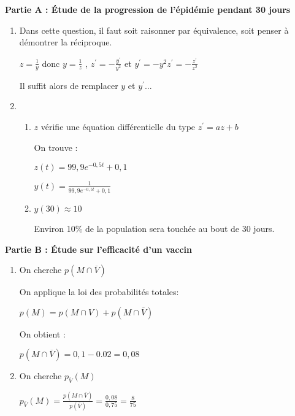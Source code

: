           \begin{corrige}
               \textbf{Partie A : Étude de la progression de l'épidémie pendant 30 jours}
               \begin{enumerate}
                    \item
                    Dans cette question, il faut soit raisonner par équivalence, soit penser à démontrer la réciproque.
                    \par
                    $z=\frac{1}{y}$ donc $y=\frac{1}{z}$ , $z^{\prime}=-\frac{y^{\prime}}{y^{2}}$ et $y^{\prime}=-y^{2}z^{\prime}=-\frac{z^{\prime}}{z^{2}}$
                    \par
                    Il suffit alors de remplacer $y$ et $y^{\prime}$...
                    \item
                    \begin{enumerate}[label=\alph*.]
                         \item
                         $z$ vérifie une équation différentielle du type $z^{\prime}=az+b$
                         \par
                         On trouve :
                         \par
                         $z\left(t\right)=99,9e^{-0,5t}+0,1$
                         \par
                         $y\left(t\right)=\frac{1}{99,9e^{-0,5t}+0,1}$
                         \item
                         $y\left(30\right)\approx 10$
                         \par
                         Environ 10\% de la population sera touchée au bout de 30 jours.
                    \end{enumerate}
               \end{enumerate}
               \textbf{Partie B : Étude sur l'efficacité d'un vaccin}
               \begin{enumerate}
                    \item
                    On cherche $p\left(M \cap  \overline{V}\right)$
                    \par
                    On applique la loi des probabilités totales:
                    \par
                    $p\left(M\right)=p\left(M \cap  V\right)+p\left(M \cap  \overline{V}\right)$
                    \par
                    On obtient :
                    \par
                    $p\left(M \cap  \overline{V}\right)=0,1-0.02=0,08$
                    \item
                    On cherche $p_{\overline{V}}\left(M\right)$
                    \par
                    $p_{\overline{V}}\left(M\right)=\frac{p\left(M \cap  \overline{V}\right)}{p\left(\overline{V}\right)}=\frac{0,08}{0,75}=\frac{8}{75}$
               \end{enumerate}
\end{corrige}
